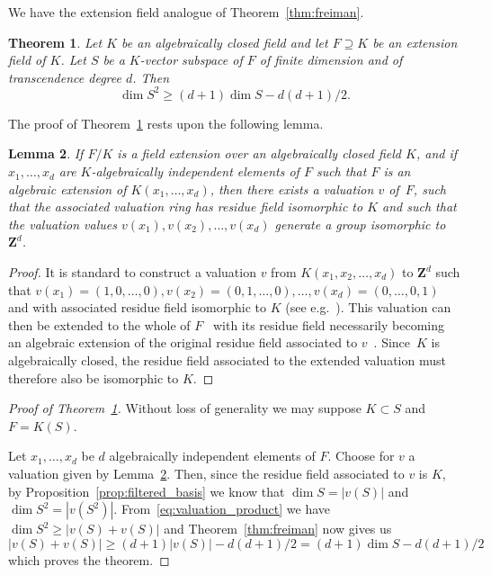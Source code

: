 \documentclass[10pt]{amsart}
\newtheorem{theo}{Theorem}[section]
\newtheorem{lemm}[theo]{Lemma}
\theoremstyle{definition}
\theoremstyle{remark}
\newcommand*\Z{{\mathbf Z}}
\renewcommand{\geq}{\geqslant}
\begin{document}
We have the extension field analogue of Theorem~\ref{thm:freiman}.

\begin{theo}\label{thm:freiman_field}
Let $K$ be {an algebraically closed} field and let $F \supseteq K$ be an extension field of $K$. Let $S$ be a $K$-vector subspace of $F$ of finite dimension and of transcendence degree $d$. Then
\[
\dim S^2\geq(d+1)\dim S -d(d+1)/2.
\]
\end{theo}

The proof of Theorem~\ref{thm:freiman_field} rests upon the following lemma.

\begin{lemm}\label{lem:val}
If $F/K$ is a field extension over an algebraically closed field $K$, and if $x_1,\ldots,x_d$ are $K$-algebraically independent elements of $F$ such that $F$ is an algebraic extension of $K(x_1,\ldots,x_d)$, then there exists a valuation $v$ of~$F$, such that the associated valuation ring has residue field isomorphic to $K$ and such that the valuation values $v(x_1),v(x_2),\ldots,v(x_d)$ generate a group isomorphic to~$\Z^d$.
\end{lemm}

\begin{proof}
It is standard to construct a valuation $v$ from $K(x_1,x_2,\ldots ,x_d)$ to $\Z^d$ such that $v(x_1)=(1,0,\ldots,0), v(x_2)=(0,1,\ldots,0),\ldots, v(x_d)=(0,\ldots,0,1)$ and with associated residue field isomorphic to $K$ (see e.g.~\cite[Chapter~6, \S 3.4, Example~6]{Bourbaki_AlgComm5-6}). This valuation can then be extended to the whole of $F$~\cite[Chapter~6, \S 3.3, Proposition~5]{Bourbaki_AlgComm5-6} with its residue field necessarily becoming an algebraic extension of the original residue field associated to $v$~\cite[Chapter~6, \S 8.1, Proposition~1]{Bourbaki_AlgComm5-6}. Since~$K$ is algebraically closed, the residue field associated to the extended valuation must therefore also be isomorphic to $K$.
\end{proof}

\begin{proof}[Proof of Theorem~\ref{thm:freiman_field}]
Without loss of generality we may suppose $K\subset S$ and $F=K(S)$.

Let $x_1,\ldots,x_d$ be $d$ algebraically independent elements of $F$. Choose for $v$ a valuation given by Lemma~\ref{lem:val}. Then, since the residue field associated to $v$ is $K$, by Proposition~\ref{prop:filtered_basis} we know that $\dim S=|v(S)|$ and $\dim S^2=|v(S^2)|$. From~\eqref{eq:valuation_product} we have $\dim S^2\geq|v(S)+v(S)|$ and Theorem~\ref{thm:freiman} now gives us
\[
|v(S)+v(S)|\geq(d+1)|v(S)|-d(d+1)/2=(d+1)\dim S-d(d+1)/2
\]
which proves the theorem.
\end{proof}
\end{document}
